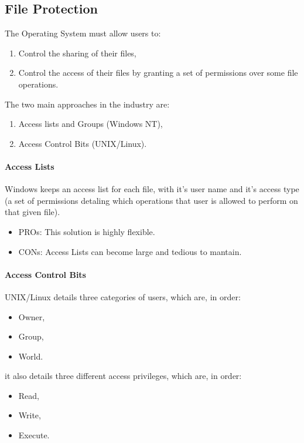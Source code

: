\documentclass[openright, twoside]{report}
\theoremstyle{definition}
\theoremstyle{example}
\begin{document}
\subsection{File Protection}
The Operating System must allow users to:

\begin{enumerate}
	\item Control the sharing of their files,
	\item Control the access of their files by granting a set of permissions 
	over some file operations.
\end{enumerate}

The two main approaches in the industry are:

\begin{enumerate}
	\item Access lists and Groups (Windows NT),
	\item Access Control Bits (UNIX/Linux).
\end{enumerate}

\paragraph{Access Lists}
Windows keeps an access list for each file, with it's user name and 
it's access type (a set of permissions detaling which operations 
that user is allowed to perform on that given file).

\begin{itemize}
	\item PROs: This solution is highly flexible.
	\item CONs: Access Lists can become large and tedious to mantain.
\end{itemize}

\paragraph{Access Control Bits}
UNIX/Linux details three categories of users, which are, in order:

\begin{multicols}{3}
	\begin{itemize}
		\item Owner,
		\item Group,
		\item World.
	\end{itemize}
\end{multicols}

it also details three different access privileges, which are, in order:
\begin{multicols}{3}
	\begin{itemize}
		\item Read,
		\item Write,
		\item Execute.
	\end{itemize}
\end{multicols}
\end{document}
